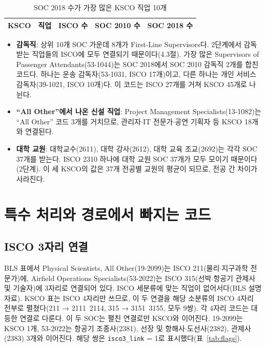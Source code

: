 \documentclass[11pt]{article}
\begin{document}
\begin{longtable}{L{1.3cm}L{7.6cm}R{1.6cm}R{1.9cm}R{1.9cm}}
\caption{SOC 2018 수가 가장 많은 KSCO 직업 10개}\label{tab:xksco}\\
\toprule
KSCO & 직업 & ISCO 수 & SOC 2010 수 & SOC 2018 수 \\
\midrule

\bottomrule
\end{longtable}

\begin{itemize}[leftmargin=*]
  \item \textbf{감독직}: 상위 10개 SOC 가운데 8개가 First-Line Supervisors다. 2단계에서 감독받는 직업들의 ISCO에 모두 연결되기 때문이다(4.3절). 가장 많은 Supervisors of Passenger Attendants(53-1044)는 SOC 2018에서 SOC 2010 감독직 2개를 합친 코드다. 하나는 운송 감독자(53-1031, ISCO 17개)이고, 다른 하나는 개인 서비스 감독자(39-1021, ISCO 10개)다. 이 코드는 ISCO 27개를 거쳐 KSCO 45개로 나뉜다.
  \item \textbf{``All Other''에서 나온 신설 직업}: Project Management Specialists(13-1082)는 ``All Other'' 코드 3개를 거치므로, 관리자$\cdot$IT 전문가$\cdot$공연 기획자 등 KSCO 18개와 연결된다.
  \item \textbf{대학 교원}: 대학교수(2611), 대학 강사(2612), 대학 교육 조교(2692)는 각각 SOC 37개를 받는다. ISCO 2310 하나에 대학 교원 SOC 37개가 모두 모이기 때문이다(2단계). 이 세 KSCO의 값은 37개 전공별 교원의 평균이 되므로, 전공 간 차이가 사라진다.
\end{itemize}

\section{특수 처리와 경로에서 빠지는 코드}

\subsection{ISCO 3자리 연결}

BLS 표에서 Physical Scientists, All Other(19-2099)는 ISCO 211(물리$\cdot$지구과학 전문가)에, Airfield Operations Specialists(53-2022)는 ISCO 315(선박$\cdot$항공기 관제사 및 기술자)에 3자리로 연결되어 있다. ISCO 세분류에 맞는 직업이 없어서다(BLS 설명 자료). KSCO 표는 ISCO 4자리만 쓰므로, 이 두 연결을 해당 소분류의 ISCO 4자리 전부로 펼쳤다(211 → 2111~2114, 315 → 3151~3155, 모두 9쌍). 각 4자리 코드는 대등한 연결로 다룬다. 이 두 SOC는 펼친 연결로만 KSCO와 이어진다. 19-2099는 KSCO 1개, 53-2022는 항공기 조종사(2381), 선장 및 항해사$\cdot$도선사(2382), 관제사(2383) 3개와 이어진다. 해당 쌍은 \texttt{isco3\_link} = 1로 표시했다(표~\ref{tab:flags}).
\end{document}
